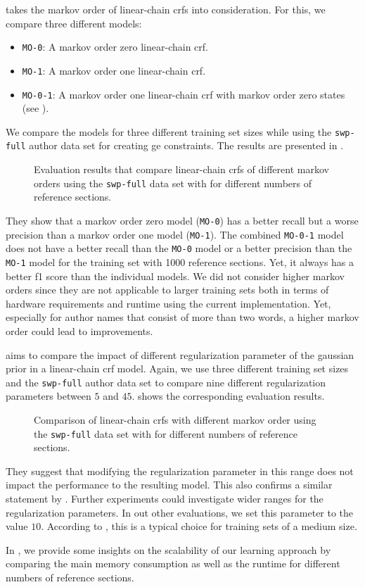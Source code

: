 \bigskip

 takes the \gls{markov order} of \glspl{linear-chain crf} into consideration.
For this, we compare three different models:
\begin{itemize}
  \item \texttt{MO-0}: A \gls{markov order} zero \gls{linear-chain crf}.
  \item \texttt{MO-1}: A \gls{markov order} one \gls{linear-chain crf}.
  \item \texttt{MO-0-1}: A \gls{markov order} one \gls{linear-chain crf} with \gls{markov order} zero states (see ).
\end{itemize}
We compare the models for three different training set sizes while using the \texttt{swp-full} author data set for creating \gls{ge} constraints.
The results are presented in .
\begin{figure}

\caption{Evaluation results that compare \glspl{linear-chain crf} of different \glspl{markov order} using the \texttt{swp-full} data set with for different numbers of reference sections.}
\label{fig:eval-markov-orders}
\end{figure}
They show that a \gls{markov order} zero model (\texttt{MO-0}) has a better \gls{recall} but a worse \gls{precision} than a \gls{markov order} one model (\texttt{MO-1}).
The combined \texttt{MO-0-1} model does not have a better recall than the \texttt{MO-0} model or a better precision than the \texttt{MO-1} model for the training set with \num{1000} reference sections.
Yet, it always has a better \gls{f1 score} than the individual models.
We did not consider higher \glspl{markov order} since they are not applicable to larger training sets both in terms of hardware requirements and runtime using the current implementation.
Yet, especially for author names that consist of more than two words, a higher \gls{markov order} could lead to improvements.

\bigskip

 aims to compare the impact of different \gls{regularization parameter} of the \gls{gaussian prior} in a \gls{linear-chain crf} model.
Again, we use three different training set sizes and the \texttt{swp-full} author data set to compare nine different \glspl{regularization parameter} between $5$ and $45$.
 shows the corresponding evaluation results.
\begin{figure}

\caption{Comparison of \glspl{linear-chain crf} with different \gls{markov order} using the \texttt{swp-full} data set with for different numbers of reference sections.}
\label{fig:eval-gaussian}
\end{figure}
They suggest that modifying the \gls{regularization parameter} in this range does not impact the performance to the resulting model.
This also confirms a similar statement by \citet{sutton2010introduction}.
Further experiments could investigate wider ranges for the \glspl{regularization parameter}.
In out other evaluations, we set this parameter to the value $10$.
According to \citet{sutton2010introduction}, this is a typical choice for training sets of a medium size.

\bigskip

In , we provide some insights on the scalability of our learning approach by comparing the main memory consumption as well as the runtime for different numbers of reference sections.

